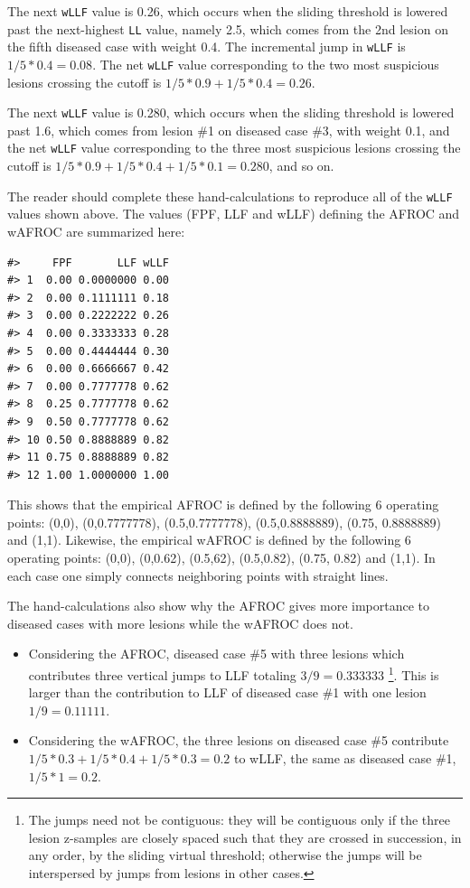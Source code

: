 \documentclass[
]{book}
\begin{document}
The next \texttt{wLLF} value is 0.26, which occurs when the sliding threshold is lowered past the next-highest \texttt{LL} value, namely 2.5, which comes from the 2nd lesion on the fifth diseased case with weight 0.4. The incremental jump in \texttt{wLLF} is \(1/5*0.4 = 0.08\). The net \texttt{wLLF} value corresponding to the two most suspicious lesions crossing the cutoff is \(1/5*0.9 + 1/5*0.4 = 0.26\).

The next \texttt{wLLF} value is 0.280, which occurs when the sliding threshold is lowered past 1.6, which comes from lesion \#1 on diseased case \#3, with weight 0.1, and the net \texttt{wLLF} value corresponding to the three most suspicious lesions crossing the cutoff is \(1/5*0.9 + 1/5*0.4 + 1/5*0.1 = 0.280\), and so on.

The reader should complete these hand-calculations to reproduce all of the \texttt{wLLF} values shown above. The values (FPF, LLF and wLLF) defining the AFROC and wAFROC are summarized here:

\begin{verbatim}
#>     FPF       LLF wLLF
#> 1  0.00 0.0000000 0.00
#> 2  0.00 0.1111111 0.18
#> 3  0.00 0.2222222 0.26
#> 4  0.00 0.3333333 0.28
#> 5  0.00 0.4444444 0.30
#> 6  0.00 0.6666667 0.42
#> 7  0.00 0.7777778 0.62
#> 8  0.25 0.7777778 0.62
#> 9  0.50 0.7777778 0.62
#> 10 0.50 0.8888889 0.82
#> 11 0.75 0.8888889 0.82
#> 12 1.00 1.0000000 1.00
\end{verbatim}

This shows that the empirical AFROC is defined by the following 6 operating points: (0,0), (0,0.7777778), (0.5,0.7777778), (0.5,0.8888889), (0.75, 0.8888889) and (1,1). Likewise, the empirical wAFROC is defined by the following 6 operating points: (0,0), (0,0.62), (0.5,62), (0.5,0.82), (0.75, 0.82) and (1,1). In each case one simply connects neighboring points with straight lines.

The hand-calculations also show why the AFROC gives more importance to diseased cases with more lesions while the wAFROC does not.

\begin{itemize}
\item
  Considering the AFROC, diseased case \#5 with three lesions which contributes three vertical jumps to LLF totaling \(3/9 = 0.333333\) \footnote{The jumps need not be contiguous: they will be contiguous only if the three lesion z-samples are closely spaced such that they are crossed in succession, in any order, by the sliding virtual threshold; otherwise the jumps will be interspersed by jumps from lesions in other cases.}. This is larger than the contribution to LLF of diseased case \#1 with one lesion \(1/9 = 0.11111\).
\item
  Considering the wAFROC, the three lesions on diseased case \#5 contribute \(1/5*0.3 + 1/5*0.4 + 1/5*0.3 = 0.2\) to wLLF, the same as diseased case \#1, \(1/5*1 = 0.2\).
\end{itemize}
\end{document}
